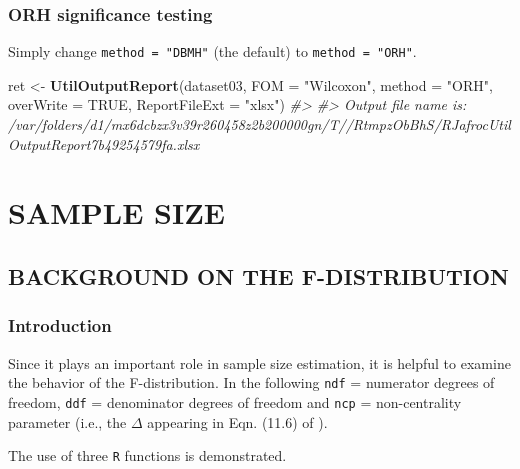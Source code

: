 \documentclass[]{book}
\newenvironment{Shaded}{\begin{snugshade}}{\end{snugshade}}
\newcommand{\CommentTok}[1]{\textcolor[rgb]{0.56,0.35,0.01}{\textit{#1}}}
\newcommand{\DataTypeTok}[1]{\textcolor[rgb]{0.13,0.29,0.53}{#1}}
\newcommand{\KeywordTok}[1]{\textcolor[rgb]{0.13,0.29,0.53}{\textbf{#1}}}
\newcommand{\NormalTok}[1]{#1}
\newcommand{\OtherTok}[1]{\textcolor[rgb]{0.56,0.35,0.01}{#1}}
\newcommand{\StringTok}[1]{\textcolor[rgb]{0.31,0.60,0.02}{#1}}
\begin{document}
\hypertarget{orh-significance-testing-1}{%
\section{ORH significance testing}\label{orh-significance-testing-1}}

Simply change \texttt{method\ =\ "DBMH"} (the default) to \texttt{method\ =\ "ORH"}.

\begin{Shaded}
\begin{Highlighting}[]
\NormalTok{ret <-}\StringTok{ }\KeywordTok{UtilOutputReport}\NormalTok{(dataset03, }\DataTypeTok{FOM =} \StringTok{"Wilcoxon"}\NormalTok{, }\DataTypeTok{method =} \StringTok{"ORH"}\NormalTok{, }\DataTypeTok{overWrite =} \OtherTok{TRUE}\NormalTok{, }\DataTypeTok{ReportFileExt =} \StringTok{"xlsx"}\NormalTok{)}
\CommentTok{#> }
\CommentTok{#> Output file name is:      /var/folders/d1/mx6dcbzx3v39r260458z2b200000gn/T//RtmpzObBhS/RJafrocUtilOutputReport7b49254579fa.xlsx}
\end{Highlighting}
\end{Shaded}

\hypertarget{part-sample-size}{%
\part*{SAMPLE SIZE}\label{part-sample-size}}

\hypertarget{SSFDistr}{%
\chapter{BACKGROUND ON THE F-DISTRIBUTION}\label{SSFDistr}}

\hypertarget{introduction-6}{%
\section{Introduction}\label{introduction-6}}

Since it plays an important role in sample size estimation, it is helpful to examine the behavior of the F-distribution. In the following \texttt{ndf} = numerator degrees of freedom, \texttt{ddf} = denominator degrees of freedom and \texttt{ncp} = non-centrality parameter (i.e., the \(\Delta\) appearing in Eqn. (11.6) of \citep{RN2680}).

The use of three \texttt{R} functions is demonstrated.
\end{document}
